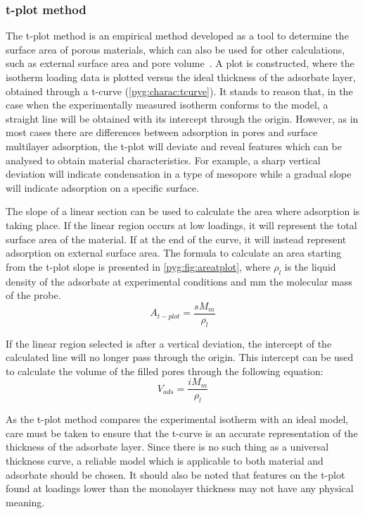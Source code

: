 \subsubsection{t-plot method}\label{pyg:charac:tplot}

The t-plot method is an empirical method developed as a
tool to determine the surface area of porous materials,
which can also be used for other calculations, such as
external surface area and pore volume~\cite{lippensStudiesPoreSystems1965}.
A plot is constructed, where the isotherm loading
data is plotted versus the ideal thickness of the adsorbate layer,
obtained through a t-curve (\autoref{pyg:charac:tcurve}).
It stands to reason that, in the case when the experimentally measured
isotherm conforms to the model, a straight line will be obtained with its
intercept through the origin. However, as in most cases there
are differences between adsorption in pores and surface multilayer
adsorption, the t-plot will deviate and reveal features which can
be analysed to obtain material characteristics. For example, a sharp
vertical deviation will indicate condensation in a type of mesopore
while a gradual slope will indicate adsorption on a specific surface.

The slope of a linear section can be used to calculate the area where
adsorption is taking place. If the linear region occurs at low loadings,
it will represent the total surface area of the material.
If at the end of the curve, it will instead represent adsorption on
external surface area. The formula to calculate an area starting
from the t-plot slope is presented in \autoref{pyg:fig:areatplot},
where \(\rho_{l}\) is the liquid density of the adsorbate at experimental
conditions and \gls{mm} the molecular mass of the probe.
%
\begin{equation}\label{pyg:fig:areatplot}
	A_{t-plot} = \frac{s M_m}{\rho_{l}}
\end{equation}

If the linear region selected is after a vertical deviation,
the intercept of the calculated line will no longer pass through
the origin. This intercept can be used to calculate the volume of
the filled pores through the following equation:
%
\begin{equation}
	V_{ads} = \frac{i M_m}{\rho_{l}}
\end{equation}

As the t-plot method compares the experimental isotherm
with an ideal model, care must be taken to ensure that the t-curve
is an accurate representation of the thickness of the adsorbate layer.
Since there is no such thing as a universal thickness curve,
a reliable model which is applicable to both material and adsorbate
should be chosen. It should also be noted that features on the t-plot
found at loadings lower than the monolayer thickness may not have any
physical meaning.


